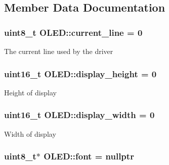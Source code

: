 \subsection{Member Data Documentation}
\hypertarget{class_o_l_e_d_aebd62601be5e2ceef6295721f17fc013}{
\subsubsection[{current\-\_\-line}]{\setlength{\rightskip}{0pt plus 5cm}uint8\-\_\-t O\-L\-E\-D\-::current\-\_\-line = 0\hspace{0.3cm}{\ttfamily [private]}}}\label{class_o_l_e_d_aebd62601be5e2ceef6295721f17fc013}
The current line used by the driver \hypertarget{class_o_l_e_d_aa14ebb59666d7822288115a04ac0a34b}{
\subsubsection[{display\-\_\-height}]{\setlength{\rightskip}{0pt plus 5cm}uint16\-\_\-t O\-L\-E\-D\-::display\-\_\-height = 0\hspace{0.3cm}{\ttfamily [private]}}}\label{class_o_l_e_d_aa14ebb59666d7822288115a04ac0a34b}
Height of display \hypertarget{class_o_l_e_d_ae88ab3d6d63a7ead982a3b7cc673eefe}{
\subsubsection[{display\-\_\-width}]{\setlength{\rightskip}{0pt plus 5cm}uint16\-\_\-t O\-L\-E\-D\-::display\-\_\-width = 0\hspace{0.3cm}{\ttfamily [private]}}}\label{class_o_l_e_d_ae88ab3d6d63a7ead982a3b7cc673eefe}
Width of display \hypertarget{class_o_l_e_d_a29ab86a4a73f4d343bf1810927f0911d}{
\subsubsection[{font}]{\setlength{\rightskip}{0pt plus 5cm}uint8\-\_\-t$\ast$ O\-L\-E\-D\-::font = nullptr\hspace{0.3cm}{\ttfamily [private]}}}\label{class_o_l_e_d_a29ab86a4a73f4d343bf1810927f0911d}
